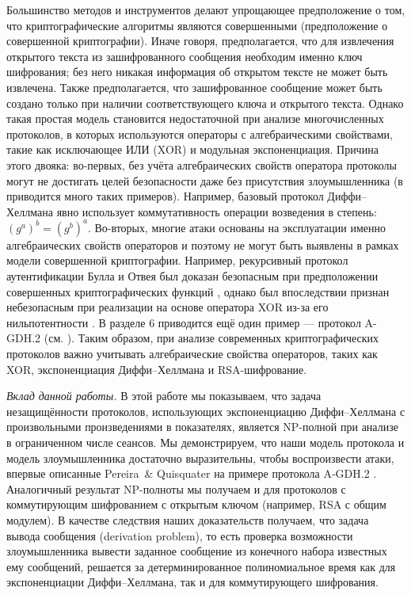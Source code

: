 Большинство методов и инструментов делают упрощающее предположение о том, что криптографические алгоритмы являются совершенными
(предположение о совершенной криптографии). Иначе говоря, предполагается, что для извлечения открытого текста из зашифрованного
сообщения необходим именно ключ шифрования; без него никакая информация об открытом тексте не может быть извлечена. Также
предполагается, что зашифрованное сообщение может быть создано только при наличии соответствующего ключа и открытого текста. Однако
такая простая модель становится недостаточной при анализе многочисленных протоколов, в которых используются операторы с
алгебраическими свойствами, такие как исключающее ИЛИ (XOR) и модульная экспоненциация. Причина этого двояка: во-первых, без учёта
алгебраических свойств оператора протоколы могут не достигать целей безопасности даже без присутствия злоумышленника (в \cite{BoydMathuria2003} приводится много таких примеров). Например, базовый протокол Диффи–Хеллмана явно использует коммутативность операции
возведения в степень: $(g^a)^b = (g^b)^{a}$. Во-вторых, многие атаки основаны на эксплуатации именно алгебраических свойств
операторов и поэтому не могут быть выявлены в рамках модели совершенной криптографии. Например, рекурсивный протокол аутентификации
Булла и Отвея \cite{BullOtway1997} был доказан безопасным при предположении совершенных криптографических функций \cite{Paulson1997},
однако был впоследствии признан небезопасным при реализации на основе оператора XOR из-за его нильпотентности \cite{RyanSchneider1998}. В разделе 6 приводится ещё один пример — протокол A-GDH.2 (см. \cite{BoydMathuria2003}). Таким образом, при анализе
современных криптографических протоколов важно учитывать алгебраические свойства операторов, таких как XOR, экспоненциация
Диффи–Хеллмана и RSA-шифрование.

\textit{Вклад данной работы.} В этой работе мы показываем, что задача незащищённости протоколов, использующих экспоненциацию
Диффи–Хеллмана с произвольными произведениями в показателях, является NP-полной при анализе в ограниченном числе сеансов. Мы
демонстрируем, что наши модель протокола и модель злоумышленника достаточно выразительны, чтобы воспроизвести атаки, впервые
описанные Pereira \& Quisquater на примере протокола A‑GDH.2 \cite{PereiraQuisquater2001}. Аналогичный результат NP-полноты мы
получаем и для протоколов с коммутирующим шифрованием с открытым ключом (например, RSA с общим модулем). В качестве следствия наших
доказательств получаем, что задача вывода сообщения (derivation problem), то есть проверка возможности злоумышленника вывести
заданное сообщение из конечного набора известных ему сообщений, решается за детерминированное полиномиальное время как для
экспоненциации Диффи–Хеллмана, так и для коммутирующего шифрования.

